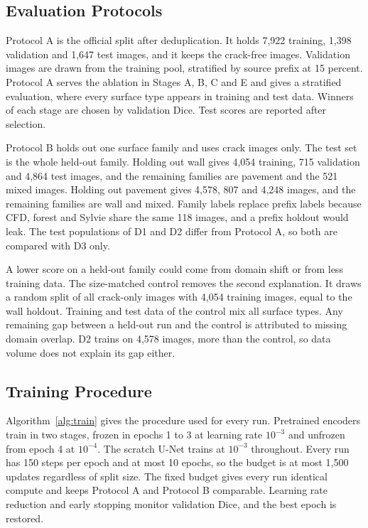 \documentclass[conference]{IEEEtran}
\begin{document}
\subsection{Evaluation Protocols}
Protocol A is the official split after deduplication. It holds 7,922 training, 1,398 validation and 1,647 test images, and it keeps the crack-free images. Validation images are drawn from the training pool, stratified by source prefix at 15 percent. Protocol A serves the ablation in Stages A, B, C and E and gives a stratified evaluation, where every surface type appears in training and test data. Winners of each stage are chosen by validation Dice. Test scores are reported after selection.

Protocol B holds out one surface family and uses crack images only. The test set is the whole held-out family. Holding out wall gives 4,054 training, 715 validation and 4,864 test images, and the remaining families are pavement and the 521 mixed images. Holding out pavement gives 4,578, 807 and 4,248 images, and the remaining families are wall and mixed. Family labels replace prefix labels because CFD, forest and Sylvie share the same 118 images, and a prefix holdout would leak. The test populations of D1 and D2 differ from Protocol A, so both are compared with D3 only.

A lower score on a held-out family could come from domain shift or from less training data. The size-matched control removes the second explanation. It draws a random split of all crack-only images with 4,054 training images, equal to the wall holdout. Training and test data of the control mix all surface types. Any remaining gap between a held-out run and the control is attributed to missing domain overlap. D2 trains on 4,578 images, more than the control, so data volume does not explain its gap either.

\subsection{Training Procedure}
Algorithm~\ref{alg:train} gives the procedure used for every run. Pretrained encoders train in two stages, frozen in epochs 1 to 3 at learning rate $10^{-3}$ and unfrozen from epoch 4 at $10^{-4}$. The scratch U-Net trains at $10^{-3}$ throughout. Every run has 150 steps per epoch and at most 10 epochs, so the budget is at most 1,500 updates regardless of split size. The fixed budget gives every run identical compute and keeps Protocol A and Protocol B comparable. Learning rate reduction and early stopping monitor validation Dice, and the best epoch is restored.
\end{document}
